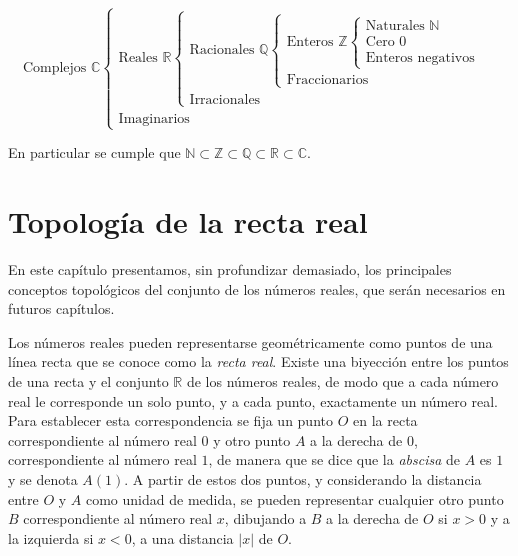 \documentclass[
  a4paper,
]{scrreport}
\theoremstyle{definition}
\theoremstyle{plain}
\theoremstyle{plain}
\theoremstyle{definition}
\theoremstyle{definition}
\theoremstyle{plain}
\theoremstyle{remark}
\begin{document}
\[
\mbox{Complejos } \mathbb{C}
    \begin{cases}
    \mbox{Reales } \mathbb{R}
    \begin{cases}
        \mbox{Racionales } \mathbb{Q}
        \begin{cases}
            \mbox{Enteros } \mathbb{Z}
            \begin{cases}
                \mbox{Naturales } \mathbb{N} \\
                \mbox{Cero } 0\\
                \mbox{Enteros negativos}
                \end{cases}\\
            \mbox{Fraccionarios}
        \end{cases}\\
        \mbox{Irracionales}
    \end{cases}\\
    \mbox{Imaginarios}
    \end{cases}
\]

En particular se cumple que
\(\mathbb{N} \subset \mathbb{Z} \subset \mathbb{Q} \subset \mathbb{R} \subset \mathbb{C}\).


\hypertarget{topologuxeda-de-la-recta-real}{%
\chapter{Topología de la recta
real}\label{topologuxeda-de-la-recta-real}}

En este capítulo presentamos, sin profundizar demasiado, los principales
conceptos topológicos del conjunto de los números reales, que serán
necesarios en futuros capítulos.

Los números reales pueden representarse geométricamente como puntos de
una línea recta que se conoce como la \emph{recta real}. Existe una
biyección entre los puntos de una recta y el conjunto \(\mathbb{R}\) de
los números reales, de modo que a cada número real le corresponde un
solo punto, y a cada punto, exactamente un número real. Para establecer
esta correspondencia se fija un punto \(O\) en la recta correspondiente
al número real \(0\) y otro punto \(A\) a la derecha de \(0\),
correspondiente al número real \(1\), de manera que se dice que la
\emph{abscisa} de \(A\) es \(1\) y se denota \(A(1)\). A partir de estos
dos puntos, y considerando la distancia entre \(O\) y \(A\) como unidad
de medida, se pueden representar cualquier otro punto \(B\)
correspondiente al número real \(x\), dibujando a \(B\) a la derecha de
\(O\) si \(x>0\) y a la izquierda si \(x<0\), a una distancia \(|x|\) de
\(O\).
\end{document}
